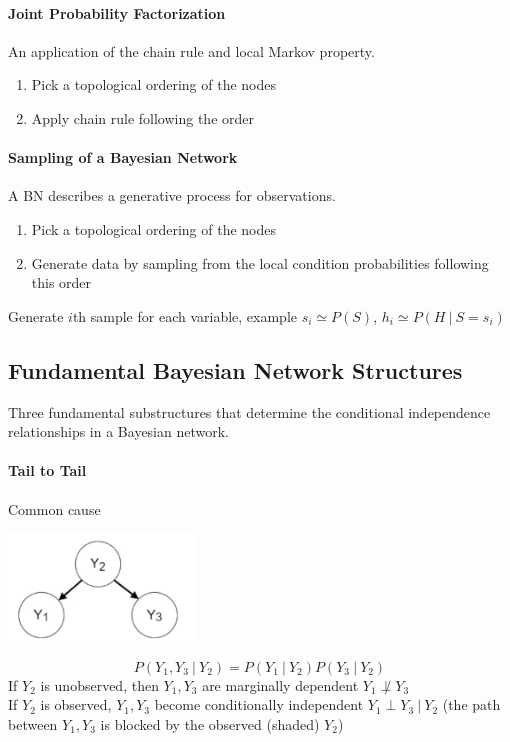 \documentclass[10pt]{report}
\begin{document}
\paragraph{Joint Probability Factorization} An application of the chain rule and local Markov property.\begin{enumerate}
	\item Pick a topological ordering of the nodes
	\item Apply chain rule following the order
\end{enumerate}
\paragraph{Sampling of a Bayesian Network} A BN describes a generative process for observations.
\begin{enumerate}
	\item Pick a topological ordering of the nodes
	\item Generate data by sampling from the local condition probabilities following this order
\end{enumerate}
Generate $i$th sample for each variable, example $s_i\simeq P(S)$, $h_i\simeq P(H\:|\:S=s_i)$
\subsection{Fundamental Bayesian Network Structures}
Three fundamental substructures that determine the conditional independence relationships in a Bayesian network.
\paragraph{Tail to Tail} Common cause \begin{center}
	\includegraphics[scale=0.75]{20.png}
\end{center}
$$P(Y_1,Y_3\:|\:Y_2)=P(Y_1\:|\:Y_2)P(Y_3\:|\:Y_2)$$
If $Y_2$ is unobserved, then $Y_1,Y_3$ are marginally dependent $Y_1\not\perp Y_3$\\
If $Y_2$ is observed, $Y_1,Y_3$ become conditionally independent $Y_1\perp Y_3\:|\:Y_2$ (the path between $Y_1,Y_3$ is blocked by the observed (shaded) $Y_2$)
\end{document}
